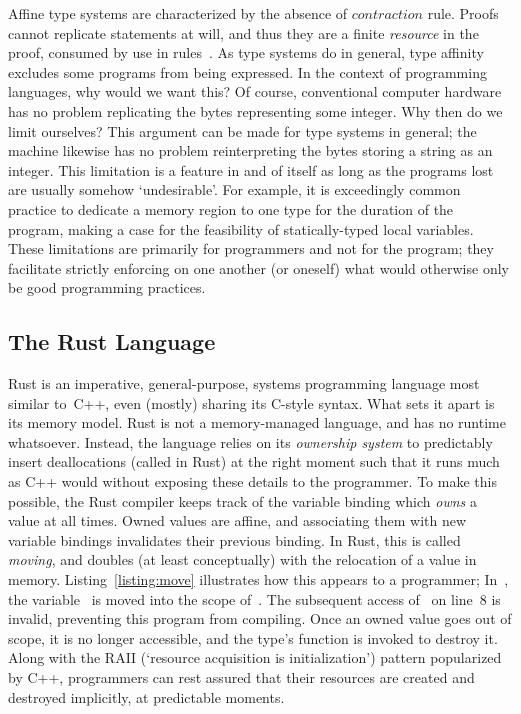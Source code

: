 Affine type systems are characterized by the absence of $contraction$ rule. Proofs cannot replicate statements at will, and thus they are a finite \textit{resource} in the proof, consumed by use in rules~\cite{walker2005substructural}.
As type systems do in general, type affinity excludes some programs from being expressed. In the context of programming languages, why would we want this? Of course, conventional computer hardware has no problem replicating the bytes representing some integer. Why then do we limit ourselves? This argument can be made for type systems in general; the machine likewise has no problem reinterpreting the bytes storing a string as an integer. This limitation is a feature in and of itself as long as the programs lost are usually somehow `undesirable'. For example, it is exceedingly common practice to dedicate a memory region to one type for the duration of the program, making a case for the feasibility of statically-typed local variables. These limitations are primarily for programmers and not for the program; they facilitate strictly enforcing on one another (or oneself) what would otherwise only be good programming practices. 


\subsection{The Rust Language}
\label{sec:rust_language}
Rust is an imperative, general-purpose, systems programming language most similar to~C++, even (mostly) sharing its C-style syntax. What sets it apart is its memory model. Rust is not a memory-managed language, and has no runtime whatsoever. Instead, the language relies on its \textit{ownership system} to predictably insert deallocations (called  in Rust) at the right moment such that it runs much as C++ would without exposing these details to the programmer.
To make this possible, the Rust compiler keeps track of the variable binding which \textit{owns} a value at all times. Owned values are affine, and associating them with new variable bindings invalidates their previous binding. In Rust, this is called \textit{moving}, and doubles (at least conceptually) with the relocation of a value in memory. 
Listing~\ref{listing:move} illustrates how this appears to a programmer; In~, the variable~ is moved into the scope of~. The subsequent access of~ on line~8 is invalid, preventing this program from compiling. Once an owned value goes out of scope, it is no longer accessible, and the type's  function is invoked to destroy it. Along with the RAII (`resource acquisition is initialization') pattern popularized by C++, programmers can rest assured that their resources are created and destroyed implicitly, at predictable moments.



